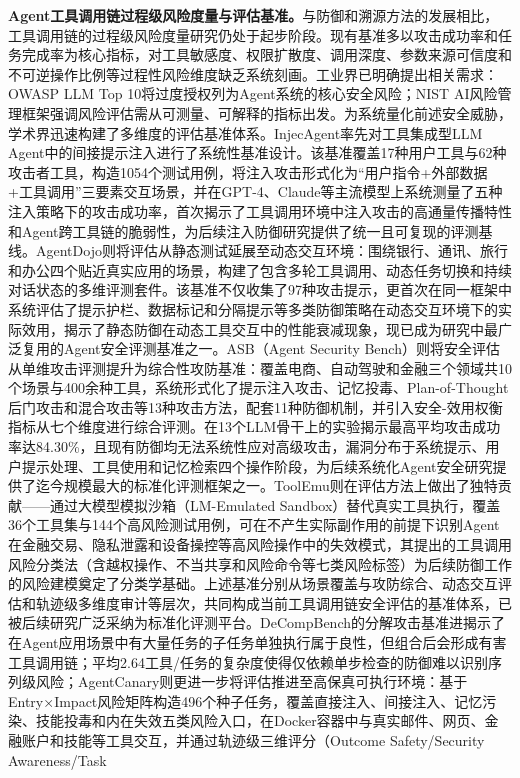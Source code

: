 \textbf{Agent工具调用链过程级风险度量与评估基准。}与防御和溯源方法的发展相比，工具调用链的过程级风险度量研究仍处于起步阶段。现有基准多以攻击成功率和任务完成率为核心指标，对工具敏感度、权限扩散度、调用深度、参数来源可信度和不可逆操作比例等过程性风险维度缺乏系统刻画。工业界已明确提出相关需求：OWASP LLM Top 10\cite{owasp2025llmtop10}将过度授权列为Agent系统的核心安全风险；NIST AI风险管理框架\cite{nist2023airmf}强调风险评估需从可测量、可解释的指标出发。为系统量化前述安全威胁，学术界迅速构建了多维度的评估基准体系。InjecAgent\cite{zhang2024injectagent}率先对工具集成型LLM Agent中的间接提示注入进行了系统性基准设计。该基准覆盖17种用户工具与62种攻击者工具，构造1054个测试用例，将注入攻击形式化为“用户指令+外部数据+工具调用”三要素交互场景，并在GPT-4、Claude等主流模型上系统测量了五种注入策略下的攻击成功率，首次揭示了工具调用环境中注入攻击的高通量传播特性和Agent跨工具链的脆弱性，为后续注入防御研究提供了统一且可复现的评测基线。AgentDojo\cite{balunovic2024agentdojo}则将评估从静态测试延展至动态交互环境：围绕银行、通讯、旅行和办公四个贴近真实应用的场景，构建了包含多轮工具调用、动态任务切换和持续对话状态的多维评测套件。该基准不仅收集了97种攻击提示，更首次在同一框架中系统评估了提示护栏、数据标记和分隔提示等多类防御策略在动态交互环境下的实际效用，揭示了静态防御在动态工具交互中的性能衰减现象，现已成为研究中\cite{chen2025struq,li2025drift,debenedetti2025camel,costa2025fides,ji2025taxonomy}最广泛复用的Agent安全评测基准之一。ASB（Agent Security Bench）\cite{zhang2025asb}则将安全评估从单维攻击评测提升为综合性攻防基准：覆盖电商、自动驾驶和金融三个领域共10个场景与400余种工具，系统形式化了提示注入攻击、记忆投毒、Plan-of-Thought后门攻击和混合攻击等13种攻击方法，配套11种防御机制，并引入安全-效用权衡指标从七个维度进行综合评测。在13个LLM骨干上的实验揭示最高平均攻击成功率达84.30\%，且现有防御均无法系统性应对高级攻击，漏洞分布于系统提示、用户提示处理、工具使用和记忆检索四个操作阶段，为后续系统化Agent安全研究提供了迄今规模最大的标准化评测框架之一。ToolEmu\cite{ruan2024toolemu}则在评估方法上做出了独特贡献——通过大模型模拟沙箱（LM-Emulated Sandbox）替代真实工具执行，覆盖36个工具集与144个高风险测试用例，可在不产生实际副作用的前提下识别Agent在金融交易、隐私泄露和设备操控等高风险操作中的失效模式，其提出的工具调用风险分类法（含越权操作、不当共享和风险命令等七类风险标签）为后续防御工作的风险建模奠定了分类学基础。上述基准分别从场景覆盖与攻防综合、动态交互评估和轨迹级多维度审计等层次，共同构成当前工具调用链安全评估的基准体系，已被后续研究\cite{vijayvargiya2025openagentsafety,he2025survey,shi2026pitoolselection,mou2026toolsafe}广泛采纳为标准化评测平台。DeCompBench\cite{kothamasu2026hidden}的分解攻击基准进揭示了在Agent应用场景中有大量任务的子任务单独执行属于良性，但组合后会形成有害工具调用链；平均2.64工具/任务的复杂度使得仅依赖单步检查的防御难以识别序列级风险；AgentCanary\cite{li2026agentcanary}则更进一步将评估推进至高保真可执行环境：基于Entry×Impact风险矩阵构造496个种子任务，覆盖直接注入、间接注入、记忆污染、技能投毒和内在失效五类风险入口，在Docker容器中与真实邮件、网页、金融账户和技能等工具交互，并通过轨迹级三维评分（Outcome Safety/Security Awareness/Task 